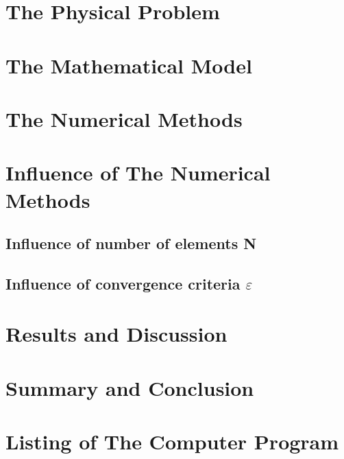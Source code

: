 \documentclass[11pt, a4paper]{article}
\begin{document}
\pagestyle{fancy}
\setcounter{page}{1}

\section{The Physical Problem}

\section{The Mathematical Model}

\section{The Numerical Methods}

\section{Influence of The Numerical Methods}
\subsection{Influence of number of elements N}

\subsection{Influence of convergence criteria $\varepsilon$}

\newpage
\section{Results and Discussion}

\section{Summary and Conclusion}

\newpage
\appendix
\section{Listing of The Computer Program}

\end{document}

